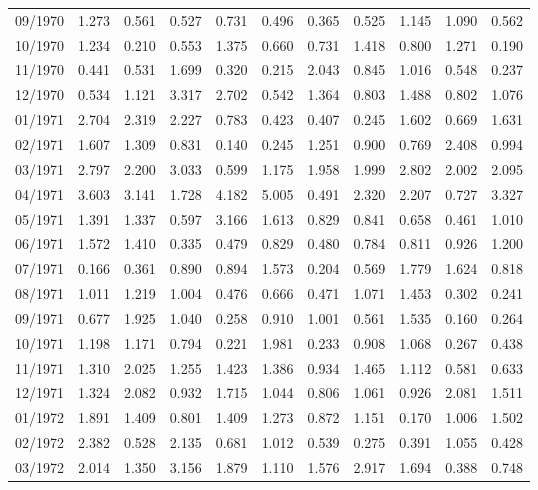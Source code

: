 \begin{tabular}{lrrrrrrrrrr}
09/1970 &  1.273 &  0.561 &  0.527 &  0.731 &  0.496 &  0.365 &  0.525 &  1.145 &  1.090 &  0.562 \\
10/1970 &  1.234 &  0.210 &  0.553 &  1.375 &  0.660 &  0.731 &  1.418 &  0.800 &  1.271 &  0.190 \\
11/1970 &  0.441 &  0.531 &  1.699 &  0.320 &  0.215 &  2.043 &  0.845 &  1.016 &  0.548 &  0.237 \\
12/1970 &  0.534 &  1.121 &  3.317 &  2.702 &  0.542 &  1.364 &  0.803 &  1.488 &  0.802 &  1.076 \\
01/1971 &  2.704 &  2.319 &  2.227 &  0.783 &  0.423 &  0.407 &  0.245 &  1.602 &  0.669 &  1.631 \\
02/1971 &  1.607 &  1.309 &  0.831 &  0.140 &  0.245 &  1.251 &  0.900 &  0.769 &  2.408 &  0.994 \\
03/1971 &  2.797 &  2.200 &  3.033 &  0.599 &  1.175 &  1.958 &  1.999 &  2.802 &  2.002 &  2.095 \\
04/1971 &  3.603 &  3.141 &  1.728 &  4.182 &  5.005 &  0.491 &  2.320 &  2.207 &  0.727 &  3.327 \\
05/1971 &  1.391 &  1.337 &  0.597 &  3.166 &  1.613 &  0.829 &  0.841 &  0.658 &  0.461 &  1.010 \\
06/1971 &  1.572 &  1.410 &  0.335 &  0.479 &  0.829 &  0.480 &  0.784 &  0.811 &  0.926 &  1.200 \\
07/1971 &  0.166 &  0.361 &  0.890 &  0.894 &  1.573 &  0.204 &  0.569 &  1.779 &  1.624 &  0.818 \\
08/1971 &  1.011 &  1.219 &  1.004 &  0.476 &  0.666 &  0.471 &  1.071 &  1.453 &  0.302 &  0.241 \\
09/1971 &  0.677 &  1.925 &  1.040 &  0.258 &  0.910 &  1.001 &  0.561 &  1.535 &  0.160 &  0.264 \\
10/1971 &  1.198 &  1.171 &  0.794 &  0.221 &  1.981 &  0.233 &  0.908 &  1.068 &  0.267 &  0.438 \\
11/1971 &  1.310 &  2.025 &  1.255 &  1.423 &  1.386 &  0.934 &  1.465 &  1.112 &  0.581 &  0.633 \\
12/1971 &  1.324 &  2.082 &  0.932 &  1.715 &  1.044 &  0.806 &  1.061 &  0.926 &  2.081 &  1.511 \\
01/1972 &  1.891 &  1.409 &  0.801 &  1.409 &  1.273 &  0.872 &  1.151 &  0.170 &  1.006 &  1.502 \\
02/1972 &  2.382 &  0.528 &  2.135 &  0.681 &  1.012 &  0.539 &  0.275 &  0.391 &  1.055 &  0.428 \\
03/1972 &  2.014 &  1.350 &  3.156 &  1.879 &  1.110 &  1.576 &  2.917 &  1.694 &  0.388 &  0.748 \\

\end{tabular}
